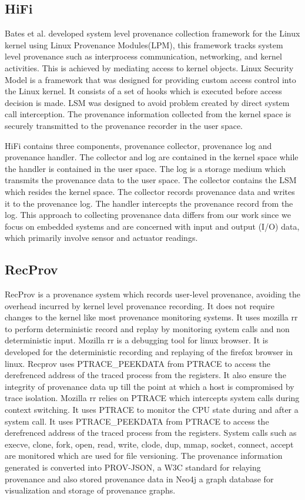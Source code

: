 \subsection{HiFi}
Bates et al. \cite{hi_fi}  developed system level provenance collection framework for the Linux kernel using Linux Provenance Modules(LPM), this framework tracks system level provenance such as interprocess communication, networking, and kernel activities. This is achieved by mediating access to kernel objects. Linux Security Model is a framework that was designed for providing custom access control into the Linux kernel. It consists of a set of hooks which is executed before access decision is made. LSM was designed to avoid problem created by direct system call interception. The provenance information collected from the kernel space is securely transmitted to the provenance recorder in the user space. 
\par HiFi contains three components, provenance collector, provenance log and provenance handler. The collector and log are contained in the kernel space while the handler is contained in the user space. The log is a storage medium which transmits the provenance data to the user space. The collector contains the LSM which resides the kernel space. The collector records provenance data and writes it to the provenance log. The handler intercepts the provenance record from the log. This approach to collecting provenance data differs from our work since we focus on embedded systems and are concerned with input and output (I/O) data, which primarily involve sensor and actuator readings.

\subsection{RecProv}

RecProv \cite{rec_prov} is a provenance system which records user-level provenance, avoiding the overhead incurred by kernel level provenance recording. It does not require changes to the kernel like most provenance monitoring systems. It uses mozilla rr to perform deterministic record and replay by monitoring system calls  and non deterministic input. Mozilla rr is a debugging tool for linux browser. It is developed for the deterministic recording and replaying of the firefox browser in linux. Recprov uses PTRACE\_PEEKDATA from PTRACE to access the derefrenced address of the traced process from the registers. It also ensure the integrity of provenance data up till the point at which a host is compromised by trace isolation. Mozilla rr relies on PTRACE which intercepts system calls during context switching. It uses PTRACE to monitor the CPU state during and after a system call. It uses PTRACE\_PEEKDATA from PTRACE to access the derefrenced address of the traced process from the registers. System calls such as execve, clone, fork, open, read, write, clode, dup, mmap, socket, connect, accept are monitored which are used for file versioning. The provenance information generated is converted into PROV-JSON, a W3C standard for relaying provenance and also stored provenance data in Neo4j a graph database for visualization and storage of provenance graphs. 

